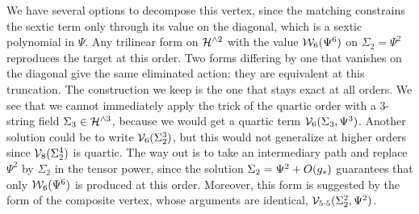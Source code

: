 We have several options to decompose this vertex, since the matching constrains the sextic term only through its value on the diagonal, which is a sextic polynomial in $\Psi$.
Any trilinear form on $\mathcal{H}^{\wedge 2}$ with the value $\mathcal{W}_{6}(\Psi^6)$ on $\Sigma_2 = \Psi^2$ reproduces the target at this order.
Two forms differing by one that vanishes on the diagonal give the same eliminated action: they are equivalent at this truncation.
The construction we keep is the one that stays exact at all orders.
We see that we cannot immediately apply the trick of the quartic order with a $3$-string field $\Sigma_3 \in \mathcal{H}^{\wedge 3}$, because we would get a quartic term ${\mathcal{V}}_6(\Sigma_3, \Psi^3)$.
Another solution could be to write ${\mathcal{V}}_6(\Sigma_2^3)$, but this would not generalize at higher orders since ${\mathcal{V}}_8(\Sigma_2^4)$ is quartic.\footnotemark{}
The way out is to take an intermediary path and replace $\Psi^2$ by $\Sigma_2$ in the tensor power, since the solution $\Sigma_2 = \Psi^2 + O(g_s)$ guarantees that only $\mathcal{W}_{6}(\Psi^6)$ is produced at this order.
Moreover, this form is suggested by the form of the composite vertex, whose arguments are identical, $\mathcal{V}_{5 \cdot 5}(\Sigma_2^2, \Psi^2)$.


